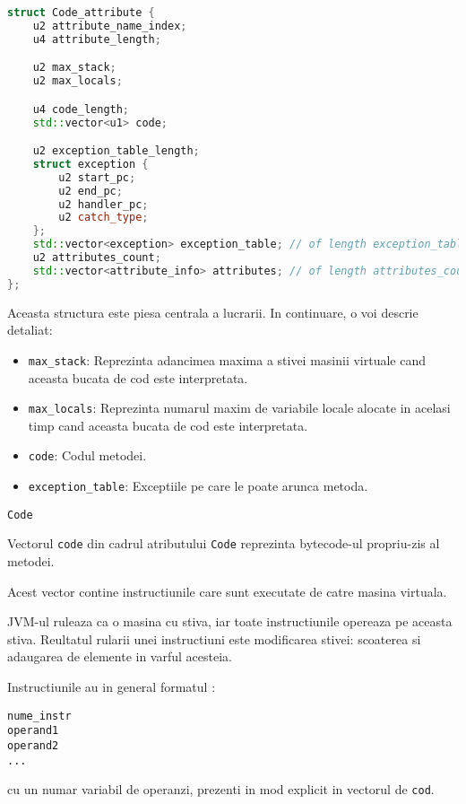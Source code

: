 \begin{lstlisting}[language=C++]
struct Code_attribute {
    u2 attribute_name_index;
    u4 attribute_length;

    u2 max_stack;
    u2 max_locals;

    u4 code_length;
    std::vector<u1> code;

    u2 exception_table_length;
    struct exception {
        u2 start_pc;
        u2 end_pc;
        u2 handler_pc;
        u2 catch_type;
    };
    std::vector<exception> exception_table; // of length exception_table_length.
    u2 attributes_count;
    std::vector<attribute_info> attributes; // of length attributes_count.
};
\end{lstlisting}

Aceasta structura este piesa centrala a lucrarii. In continuare, o voi
descrie detaliat:

\begin{itemize}
\tightlist
\item
  \texttt{max\_stack}: Reprezinta adancimea maxima a stivei masinii
  virtuale cand aceasta bucata de cod este interpretata.
\item
  \texttt{max\_locals}: Reprezinta numarul maxim de variabile locale
  alocate in acelasi timp cand aceasta bucata de cod este interpretata.
\item
  \texttt{code}: Codul metodei.
\item
  \texttt{exception\_table}: Exceptiile pe care le poate arunca metoda.
\end{itemize}

\texttt{Code}

Vectorul \texttt{code} din cadrul atributului \texttt{Code} reprezinta
bytecode-ul propriu-zis al metodei.

Acest vector contine instructiunile care sunt executate de catre masina
virtuala.

JVM-ul ruleaza ca o masina cu stiva, iar toate instructiunile opereaza
pe aceasta stiva. Reultatul rularii unei instructiuni este modificarea
stivei: scoaterea si adaugarea de elemente in varful acesteia.

Instructiunile au in general formatul \cite{instruction_format}:

\begin{verbatim}
nume_instr
operand1
operand2
...
\end{verbatim}

cu un numar variabil de operanzi, prezenti in mod explicit in vectorul
de \texttt{cod}.

